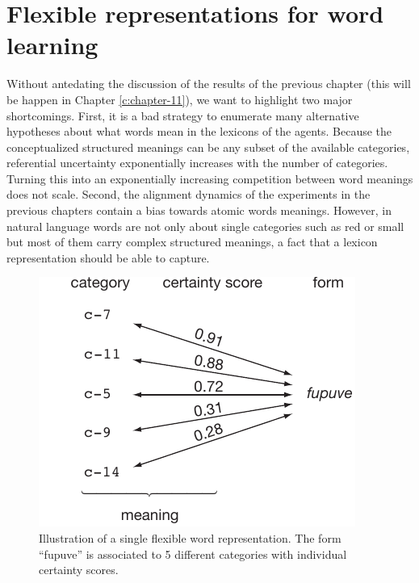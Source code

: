 
\setcounter{chapter}{5}

\chapter{Flexible representations for word learning}
\label{c:flexible}


Without antedating the discussion of the results of the previous
chapter (this will be happen in Chapter \ref{c:chapter-11}), we want
to highlight two major shortcomings. First, it is a bad strategy to
enumerate many alternative hypotheses about what words mean in the
lexicons of the agents. Because the conceptualized structured meanings
can be any subset of the available categories, referential uncertainty
exponentially increases with the number of categories. Turning this
into an exponentially increasing competition between word meanings
does not scale. Second, the alignment dynamics of the experiments in
the previous chapters contain a bias towards atomic words
meanings. However, in natural language words are not only about single
categories such as red or small but most of them carry complex
structured meanings, a fact that a lexicon representation should be
able to capture.


\begin{figure}[t]
  \includegraphics[width=0.41\linewidth]{figures/fwm-word}
  \caption{Illustration of a single flexible word representation. The
    form ``fupuve'' is associated to 5 different categories with
    individual certainty scores. }
\label{f:fwm-word}
\end{figure}


